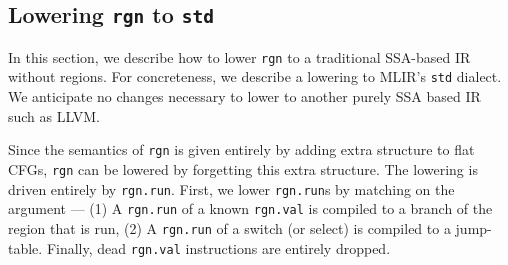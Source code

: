 \documentclass[conference]{IEEEtran}
\newcommand{\rgn}{\textcolor{pairedSixDarkRed}{\texttt{rgn}}}
\newcommand{\rgnval}{\textcolor{pairedSixDarkRed}{\texttt{rgn.val}}}
\newcommand{\rgnrun}{\textcolor{pairedSixDarkRed}{\texttt{rgn.run}}}
\newcommand{\std}{\texttt{std}}
\newcommand{\lambdapure}{\ensuremath{\lambda}\texttt{pure}}
\begin{document}
\subsection{Lowering \rgn{} to \std{}}

In this section, we describe how to lower \rgn{} to a traditional SSA-based IR
without regions. For concreteness, we describe a lowering to MLIR's \texttt{std} dialect.
We anticipate no changes necessary to lower to another purely SSA based IR such as LLVM.

Since the semantics of \rgn{} is given entirely by adding extra structure
to flat CFGs, \rgn{} can be lowered by forgetting this extra structure.
The lowering is driven entirely by \rgnrun{}. First, we lower \rgnrun{}s by matching on the argument --- (1) A \rgnrun{} of a known \rgnval{}
is compiled to a branch of the region that is run, (2) A \rgnrun{} of a switch
(or select) is compiled to a jump-table. Finally, dead \rgnval{}
instructions are entirely dropped.







\end{document}
